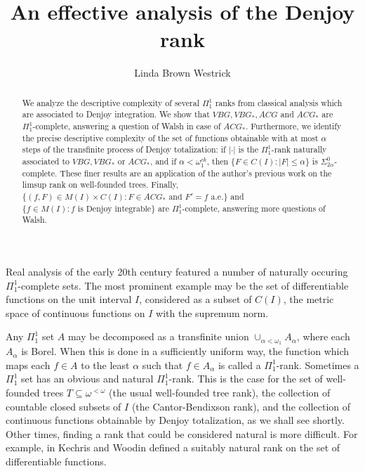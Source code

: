 \documentclass[12pt]{amsart}
\title{An effective analysis of the Denjoy rank}
\author[L.\ B.\ Westrick]{Linda Brown Westrick}
\begin{document}
\begin{abstract}
We analyze the descriptive complexity of several $\Pi^1_1$ ranks 
from classical analysis which are associated to Denjoy integration. 
We show that $VBG, VBG_\ast, ACG$ and $ACG_\ast$ are $\Pi^1_1$-complete, 
answering a question of Walsh in case of $ACG_\ast$.  Furthermore, 
we identify the precise descriptive complexity of the set of functions 
obtainable with at most $\alpha$ steps of the transfinite process 
of Denjoy totalization: 
if $|\cdot|$ is the $\Pi^1_1$-rank naturally associated to 
$VBG, VBG_\ast$ or $ACG_\ast$, and if $\alpha<\omega_1^{ck}$, 
then $\{F \in C(I): |F| \leq \alpha\}$ is $\Sigma^0_{2\alpha}$-complete. 
These finer results are an application of the author's previous 
work on the limsup rank on well-founded trees.  Finally,
$\{(f,F) \in M(I)\times C(I) : F\in ACG_\ast \text{ and } F'=f \text{ a.e.}\}$ 
and $\{f \in M(I) : f \text{ is Denjoy integrable}\}$ are 
$\Pi^1_1$-complete, answering more questions of Walsh.
\end{abstract}

\maketitle

Real analysis of the early 20th century featured a number of naturally 
occuring $\Pi^1_1$-complete sets.  The most prominent example 
may be the set of differentiable functions on the unit interval $I$, 
considered as a subset of $C(I)$, the metric space of continuous 
functions on $I$ with the supremum norm.

Any $\Pi^1_1$ set $A$ may be decomposed as a transfinite union 
$\cup_{\alpha < \omega_1} A_\alpha$, where each $A_\alpha$ is Borel. 
When this is done in a sufficiently uniform way, the function 
which maps each $f \in A$ to the least $\alpha$ such that 
$f \in A_\alpha$ is called a $\Pi^1_1$-rank.  Sometimes a $\Pi^1_1$ 
set has an obvious and natural $\Pi^1_1$-rank.  This is 
the case for the set of well-founded trees $T \subseteq \omega^{<\omega}$
(the usual well-founded tree rank), the collection of countable 
closed subsets of $I$ (the Cantor-Bendixson rank), and the 
collection of continuous functions obtainable by Denjoy totalization, 
as we shall see shortly.  Other times, finding a rank that could be 
considered natural is more difficult.  For example, in 
\cite{kw} 
Kechris 
and Woodin defined a suitably natural rank on the set of differentiable 
functions.
\end{document}
